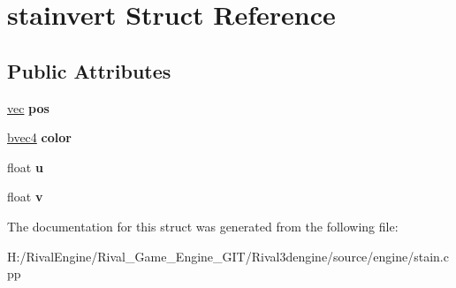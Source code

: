 \hypertarget{structstainvert}{}\section{stainvert Struct Reference}
\label{structstainvert}
\subsection*{Public Attributes}
\begin{DoxyCompactItemize}
\item 
\mbox{\label{structstainvert_ae6a1fc6e0b126004664112f88fed2b8b}} 
\hyperlink{structvec}{vec} {\bfseries pos}
\item 
\mbox{\label{structstainvert_a8c7a8b48f7e58df68ccf60c27f3084b0}} 
\hyperlink{structbvec4}{bvec4} {\bfseries color}
\item 
\mbox{\label{structstainvert_a63bc673036b5a3d4e3fdcbf0a7517326}} 
float {\bfseries u}
\item 
\mbox{\label{structstainvert_a4cc44838acfcae3a1da5e6ba0fbdcab3}} 
float {\bfseries v}
\end{DoxyCompactItemize}


The documentation for this struct was generated from the following file\+:\begin{DoxyCompactItemize}
\item 
H\+:/\+Rival\+Engine/\+Rival\+\_\+\+Game\+\_\+\+Engine\+\_\+\+G\+I\+T/\+Rival3dengine/source/engine/stain.\+cpp\end{DoxyCompactItemize}
